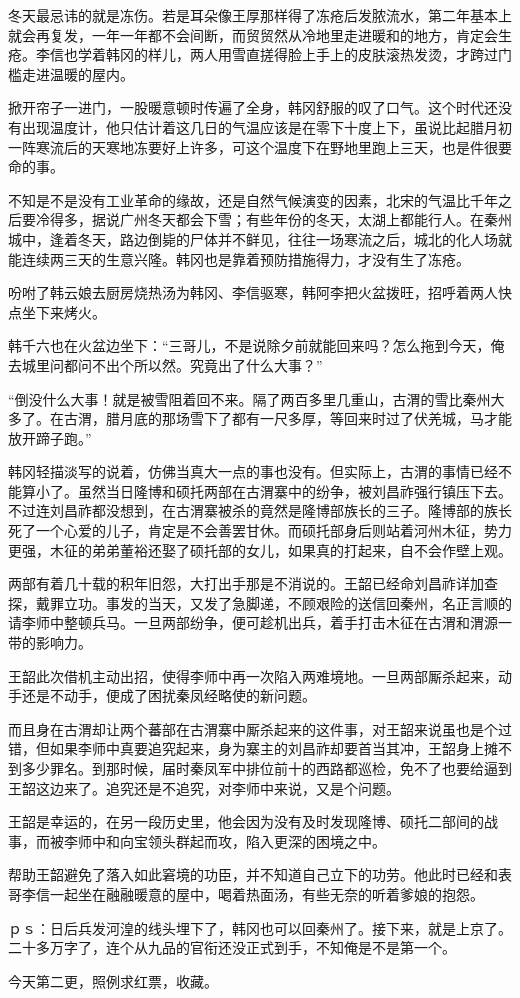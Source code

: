 冬天最忌讳的就是冻伤。若是耳朵像王厚那样得了冻疮后发脓流水，第二年基本上就会再复发，一年一年都不会间断，而贸贸然从冷地里走进暖和的地方，肯定会生疮。李信也学着韩冈的样儿，两人用雪直搓得脸上手上的皮肤滚热发烫，才跨过门槛走进温暖的屋内。

掀开帘子一进门，一股暖意顿时传遍了全身，韩冈舒服的叹了口气。这个时代还没有出现温度计，他只估计着这几日的气温应该是在零下十度上下，虽说比起腊月初一阵寒流后的天寒地冻要好上许多，可这个温度下在野地里跑上三天，也是件很要命的事。

不知是不是没有工业革命的缘故，还是自然气候演变的因素，北宋的气温比千年之后要冷得多，据说广州冬天都会下雪；有些年份的冬天，太湖上都能行人。在秦州城中，逢着冬天，路边倒毙的尸体并不鲜见，往往一场寒流之后，城北的化人场就能连续两三天的生意兴隆。韩冈也是靠着预防措施得力，才没有生了冻疮。

吩咐了韩云娘去厨房烧热汤为韩冈、李信驱寒，韩阿李把火盆拨旺，招呼着两人快点坐下来烤火。

韩千六也在火盆边坐下：“三哥儿，不是说除夕前就能回来吗？怎么拖到今天，俺去城里问都问不出个所以然。究竟出了什么大事？”

“倒没什么大事！就是被雪阻着回不来。隔了两百多里几重山，古渭的雪比秦州大多了。在古渭，腊月底的那场雪下了都有一尺多厚，等回来时过了伏羌城，马才能放开蹄子跑。”

韩冈轻描淡写的说着，仿佛当真大一点的事也没有。但实际上，古渭的事情已经不能算小了。虽然当日隆博和硕托两部在古渭寨中的纷争，被刘昌祚强行镇压下去。不过连刘昌祚都没想到，在古渭寨被杀的竟然是隆博部族长的三子。隆博部的族长死了一个心爱的儿子，肯定是不会善罢甘休。而硕托部身后则站着河州木征，势力更强，木征的弟弟董裕还娶了硕托部的女儿，如果真的打起来，自不会作壁上观。

两部有着几十载的积年旧怨，大打出手那是不消说的。王韶已经命刘昌祚详加查探，戴罪立功。事发的当天，又发了急脚递，不顾艰险的送信回秦州，名正言顺的请李师中整顿兵马。一旦两部纷争，便可趁机出兵，着手打击木征在古渭和渭源一带的影响力。

王韶此次借机主动出招，使得李师中再一次陷入两难境地。一旦两部厮杀起来，动手还是不动手，便成了困扰秦凤经略使的新问题。

而且身在古渭却让两个蕃部在古渭寨中厮杀起来的这件事，对王韶来说虽也是个过错，但如果李师中真要追究起来，身为寨主的刘昌祚却要首当其冲，王韶身上摊不到多少罪名。到那时候，届时秦凤军中排位前十的西路都巡检，免不了也要给逼到王韶这边来了。追究还是不追究，对李师中来说，又是个问题。

王韶是幸运的，在另一段历史里，他会因为没有及时发现隆博、硕托二部间的战事，而被李师中和向宝领头群起而攻，陷入更深的困境之中。

帮助王韶避免了落入如此窘境的功臣，并不知道自己立下的功劳。他此时已经和表哥李信一起坐在融融暖意的屋中，喝着热面汤，有些无奈的听着爹娘的抱怨。

ｐｓ：日后兵发河湟的线头埋下了，韩冈也可以回秦州了。接下来，就是上京了。二十多万字了，连个从九品的官衔还没正式到手，不知俺是不是第一个。

今天第二更，照例求红票，收藏。

